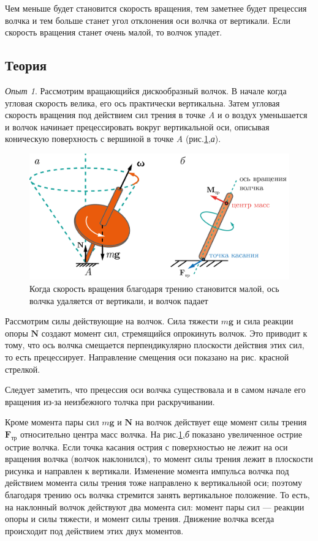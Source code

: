 Чем меньше будет становится скорость вращения, тем заметнее будет прецессия волчка и тем больше станет угол отклонения оси волчка от вертикали.
Если скорость вращения станет очень малой, то волчок упадет.

		\subsection*{\textcolor{PineGreen}{Теория}}
			
			\textit{Опыт 1}. Рассмотрим вращающийся дискообразный волчок.
			В начале когда угловая скорость велика, его ось практически вертикальна.
			Затем угловая скорость вращения под действием сил трения в точке  \textit{A} и о воздух уменьшается и волчок начинает прецессировать вокруг вертикальной оси, описывая коническую поверхность с вершиной в точке \textit{A} (рис.\ref{gyro-6},\textit{а}).
			
			\begin{figure}[H]	
				\centering 	
				\includegraphics[width=0.75\linewidth]{gyro-6.png}
				\caption{Когда скорость вращения благодаря трению становится малой, ось волчка удаляется от вертикали, и волчок падает}
				\label{gyro-6}
			\end{figure}
			
			Рассмотрим силы действующие на волчок.
			Сила тяжести $ m\textbf{g} $ и сила реакции опоры $ \textbf{N} $ создают момент сил, стремящийся опрокинуть волчок. Это приводит к тому, что ось волчка смещается перпендикулярно плоскости действия этих сил, то есть прецессирует.
			Направление смещения оси показано на рис. красной стрелкой.
			
			Следует заметить, что прецессия оси волчка существовала и в самом начале его вращения из-за неизбежного толчка при раскручивании.
			
			Кроме момента пары сил  $ m\textbf{g} $ и $ \textbf{N} $  на волчок действует еще момент силы трения $ \textbf{F}_{\text{тр}} $ относительно центра масс волчка.
			На рис.\ref{gyro-6},\textit{б} показано увеличенное острие острие волчка. 
			Если точка касания острия с поверхностью не лежит на оси вращения волчка (волчок наклонился), то момент силы трения лежит в плоскости рисунка и направлен к вертикали. Изменение момента импульса волчка под действием момента силы трения тоже направлено к вертикальной оси; поэтому благодаря трению ось волчка стремится занять вертикальное положение. 	
			То есть, на наклонный волчок действуют два момента сил: момент пары сил — реакции опоры и силы тяжести, и момент силы трения. Движение волчка всегда происходит под действием этих двух моментов.
					
